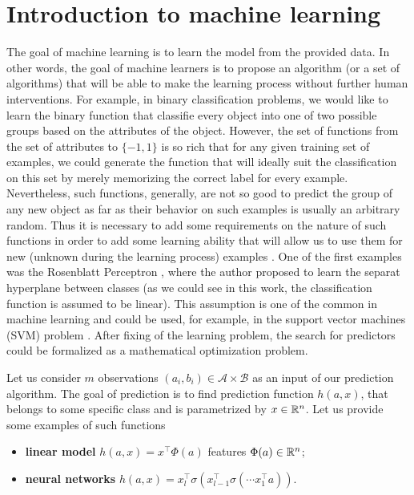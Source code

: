 \section{Introduction to machine learning}\label{sec:basics_intro}
The goal of machine learning is to learn the model from the provided data. In other words, the goal of machine learners is to propose an algorithm (or a set of algorithms) that will be able to make the learning process without further human interventions. For example, in binary classification problems, we would like to learn the binary function that classifie every object into one of two possible groups based on the attributes of the object. However, the set of functions from the set of attributes to $\{-1,1\}$ is so rich that for any given training set of examples, we could generate the function that will ideally suit the classification on this set by merely memorizing the correct label for every example. Nevertheless, such functions, generally, are not so good to predict the group of any new object as far as their behavior on such examples is usually an arbitrary random. Thus it is necessary to add some requirements on the nature of such functions in order to add some learning ability that will allow us to use them for new (unknown during the learning process) examples \cite{vapnik2013nature}. One of the first examples was the Rosenblatt Perceptron \cite{rosenblatt1960perceptron}, where the author proposed to learn the separat hyperplane {between classes} (as we could see in this work, the classification function is assumed to be linear). This assumption is one of the common in machine learning and could be used, for example, in the support vector machines (SVM) problem \cite{suykens1999least}. After fixing of the learning problem, the search for predictors could be formalized as a mathematical optimization problem.


Let us consider $m$ observations $(a_i, b_i)\in\mathcal{A}\times\mathcal{B}$ as an input of our prediction algorithm. The goal of prediction is to find prediction function $h(a, x)$, that belongs to some specific class and is parametrized by $x\in\mathbb{R}^n$. Let us provide some examples of such functions
\begin{itemize}
    \item[] {\textbf{linear model}} $h(a,x) = x^\top \Phi(a)$  features $\Phi(a)\in\mathbb{R}^n$;
    \item[] {\textbf{neural networks}} $h(a,x) = x_l^\top\sigma(x_{l-1}^\top\sigma(\cdots x_1^\top a))$.
\end{itemize}

